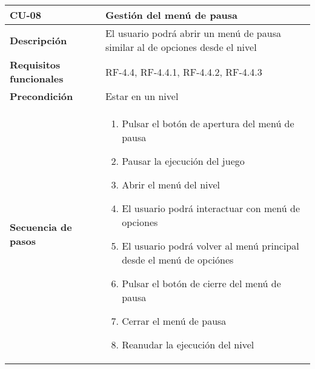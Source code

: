 \begin{tabularx}{\columnwidth}{l|l}
\begin{minipage}{0.25\columnwidth}
\textbf{CU-08} 
\end{minipage}
&
\begin{minipage}{0.65\columnwidth}
Gestión del menú de pausa
\end{minipage}
\\ \hline

\begin{minipage}{0.25\columnwidth}
\textbf{Descripción} 
\end{minipage}
&
\begin{minipage}{0.65\columnwidth}
El usuario podrá abrir un menú de pausa similar al de opciones desde el nivel
\end{minipage}
\\ \hline

\begin{minipage}{0.25\columnwidth}
\textbf{Requisitos funcionales} 
\end{minipage}
&
\begin{minipage}{0.65\columnwidth}
RF-4.4, RF-4.4.1, RF-4.4.2, RF-4.4.3
\end{minipage}
\\ \hline

\begin{minipage}{0.25\columnwidth}
\textbf{Precondición} 
\end{minipage}
&
\begin{minipage}{0.65\columnwidth}
Estar en un nivel
\end{minipage}
\\ \hline

\begin{minipage}{0.25\columnwidth}
\textbf{Secuencia de pasos} 
\end{minipage}
&
\begin{minipage}{0.65\columnwidth}
\begin{enumerate}
\item
Pulsar el botón de apertura del menú de pausa
\item
Pausar la ejecución del juego
\item
Abrir el menú del nivel
\item
El usuario podrá interactuar con menú de opciones
\item
El usuario podrá volver al menú principal desde el menú de opciónes
\item
Pulsar el botón de cierre del menú de pausa
\item
Cerrar el menú de pausa
\item
Reanudar la ejecución del nivel
\end{enumerate}
\end{minipage}
\\ \hline


\end{tabularx}
